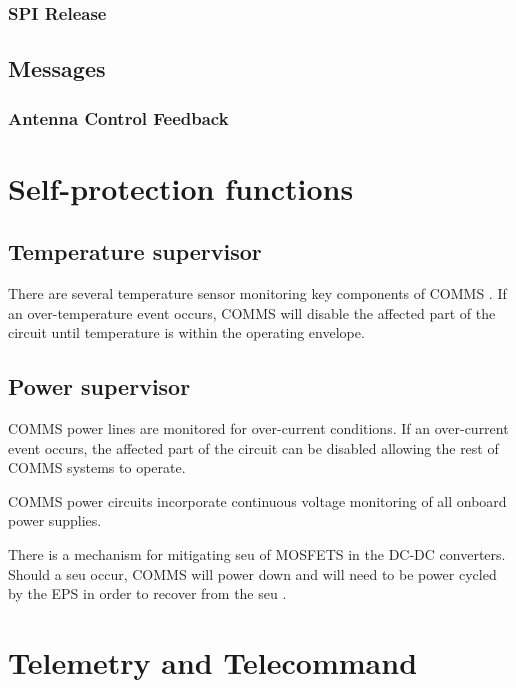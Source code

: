 \documentclass[english,title,a4paper]{report}
\begin{document}
\subsection{SPI Release}\label{spi-release}

\section{Messages}\label{messages}

\subsection{Antenna Control Feedback}\label{antenna-control-feedback}

\chapter{Self-protection functions}\label{self-protection-functions}

\section{Temperature supervisor}\label{temperature-supervisor}

There are several temperature sensor monitoring key components of COMMS \@.
If an over-temperature event occurs, COMMS will disable the affected part of the circuit until temperature is within the operating envelope.

\section{Power supervisor}\label{power-supervisor}

COMMS power lines are monitored for over-current conditions.
If an over-current event occurs, the affected part of the circuit can be disabled allowing the rest of COMMS systems to operate.

COMMS power circuits incorporate continuous voltage monitoring of all onboard power supplies.

There is a mechanism for mitigating \acrshort{seu} of MOSFETS in the DC-DC converters.
Should a \acrshort{seu} occur, COMMS will power down and will need to be power cycled by the EPS in order to recover from the \acrshort{seu} \@.

\chapter{Telemetry and Telecommand}\label{telemetry-and-telecommand}
\end{document}
